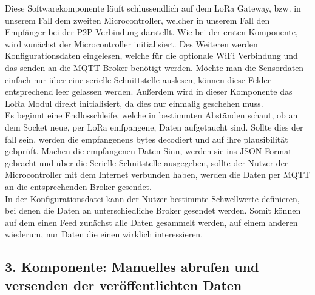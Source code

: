 Diese Softwarekomponente läuft schlussendlich auf dem LoRa Gateway, bzw. in unserem Fall dem zweiten Microcontroller, welcher in unserem Fall den Empfänger bei der P2P Verbindung darstellt.
Wie bei der ersten Komponente, wird zunächst der Microcontroller initialisiert. Des Weiteren werden Konfigurationsdaten eingelesen, welche für die optionale WiFi Verbindung und das senden an die MQTT Broker benötigt werden. Möchte man die Sensordaten einfach nur über eine serielle Schnittstelle auslesen, können diese Felder entsprechend leer gelassen werden.
Außerdem wird in dieser Komponente das LoRa Modul direkt initialisiert, da dies nur einmalig geschehen muss.\\
Es beginnt eine Endlosschleife, welche in bestimmten Abständen schaut, ob an dem Socket neue, per LoRa emfpangene, Daten aufgetaucht sind. Sollte dies der fall sein, werden die empfangenens bytes decodiert und auf ihre plausibilität gebprüft. Machen die empfangenen Daten Sinn, werden sie ins JSON Format gebracht und über die Serielle Schnitstelle ausgegeben, sollte der Nutzer der Microcontroller mit dem Internet verbunden haben, werden die Daten per MQTT an die entsprechenden Broker gesendet.\\
In der Konfigurationsdatei kann der Nutzer bestimmte Schwellwerte definieren, bei denen die Daten an unterschiedliche Broker gesendet werden. Somit können auf dem einen Feed zunächst alle Daten gesammelt werden, auf einem anderen wiederum, nur Daten die einen wirklich interessieren.

\subsection{3. Komponente: Manuelles abrufen und versenden der veröffentlichten Daten} \label{PubSub}

